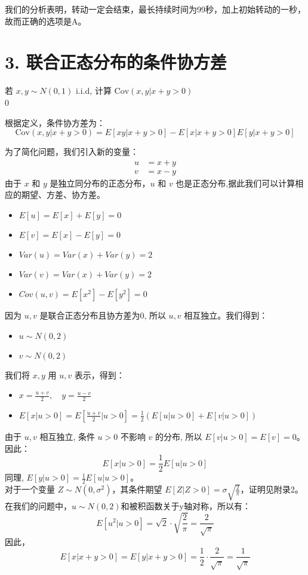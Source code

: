 \documentclass[UTF8]{ctexart}
\begin{document}
 我们的分析表明，转动一定会结束，最长持续时间为99秒，加上初始转动的一秒，故而正确的选项是A。



\section*{3. 联合正态分布的条件协方差}

若 $x, y \sim N(0,1)$ i.i.d, 计算 $\text{Cov}(x, y | x+y > 0)$
\\0

    根据定义，条件协方差为：
    \[
    \text{Cov}(x, y | x+y>0) = E[xy | x+y>0] - E[x | x+y>0]E[y | x+y>0]
    \]

    为了简化问题，我们引入新的变量：
    \begin{align*}
    u &= x + y \\
    v &= x - y
    \end{align*}
    由于 $x$ 和 $y$ 是独立同分布的正态分布，$u$ 和 $v$ 也是正态分布,据此我们可以计算相应的期望、方差、协方差。
    \begin{itemize}
        \item $E[u] = E[x] + E[y]  = 0$
        \item $E[v] = E[x] - E[y] = 0$
        \item $Var(u) = Var(x) + Var(y) = 2$
        \item $Var(v)  = Var(x) + Var(y) = 2$
        \item $Cov(u, v)  = E[x^2] - E[y^2] = 0$
    \end{itemize}

    因为 $u, v$ 是联合正态分布且协方差为0, 所以 $u, v$ 相互独立。我们得到：
    \begin{itemize}
    \item $u \sim N(0, 2)$ 
    \item $v \sim N(0, 2)$
    \end{itemize}

    我们将 $x, y$ 用 $u, v$ 表示，得到：
    \begin{itemize}
    \item $ x = \frac{u+v}{2}, \quad y = \frac{u-v}{2} $

    \item $E[x | u>0] = E\left[\frac{u+v}{2} \bigg| u>0\right] = \frac{1}{2} (E[u | u>0] + E[v | u>0])$ \\
    \end{itemize}
    由于 $u, v$ 相互独立, 条件 $u>0$ 不影响 $v$ 的分布, 所以 $E[v | u>0] = E[v] = 0$。因此：
    \[ E[x | u>0] = \frac{1}{2} E[u | u>0] \]
    同理, $E[y | u>0] = \frac{1}{2} E[u | u>0]$。\\
    对于一个变量 $Z \sim N(0, \sigma^2)$，其条件期望 $E[Z | Z>0] = \sigma \sqrt{\frac{2}{\pi}}$，证明见附录2。
    在我们的问题中，$u \sim N(0, 2)$和被积函数关于y轴对称，所以有：
    \[ E[u^2 | u>0] = \sqrt{2} \cdot \sqrt{\frac{2}{\pi}} = \frac{2}{\sqrt{\pi}} \]
    因此，
    \[ E[x | x+y>0] = E[y | x+y>0] = \frac{1}{2} \cdot \frac{2}{\sqrt{\pi}} = \frac{1}{\sqrt{\pi}} \]
    
\end{document}
